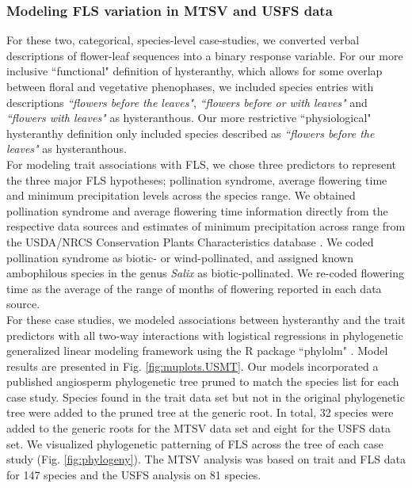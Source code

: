 \documentclass[11pt]{article}\usepackage[]{graphicx}\usepackage[]{color}
\begin{document}
\subsubsection*{Modeling FLS variation in MTSV and USFS data}
For these two, categorical, species-level case-studies, we converted verbal descriptions of flower-leaf sequences into a binary response variable. For our more inclusive ``functional" definition of hysteranthy, which allows for some overlap between floral and vegetative phenophases, we included species entries with descriptions \textit{``flowers before the leaves"}, \textit{``flowers before or with leaves"} and \textit{``flowers with leaves"} as hysteranthous. Our more restrictive ``physiological" hysteranthy definition only included species described as \textit{``flowers before the leaves"} as hysteranthous.\\

\noindent For modeling trait associations with FLS, we chose three predictors to represent the three major FLS hypotheses; pollination syndrome, average flowering time and minimum precipitation levels across the species range. We obtained pollination syndrome and average flowering time information directly from the respective data sources and estimates of minimum precipitation across range from the USDA/NRCS Conservation Plants Characteristics database \citep{usdancrs}. We coded pollination syndrome as biotic- or wind-pollinated, and assigned known ambophilous species in the genus \textit{Salix} as biotic-pollinated. We re-coded flowering time as the average of the range of months of flowering reported in each data source.\\

\noindent For these case studies, we modeled associations between hysteranthy and the trait predictors with all two-way interactions with logistical regressions in phylogenetic generalized linear modeling framework \citep{Ives2010} using the R package ``phylolm" \citep{Ho2014}. Model results are presented in Fig. \ref{fig:muplots.USMT}. Our models incorporated a published angiosperm phylogenetic tree \citep{Zanne2013} pruned to match the species list for each case study. Species found in the trait data set but not in the original phylogenetic tree were added to the pruned tree at the generic root. In total, 32 species were added to the generic roots for the MTSV data set and eight for the USFS data set. We visualized phylogenetic patterning of FLS across the tree of each case study (Fig. \ref{fig:phylogeny}). The MTSV analysis was based on trait and FLS data for 147 species and the USFS analysis on 81 species. \\
\end{document}
